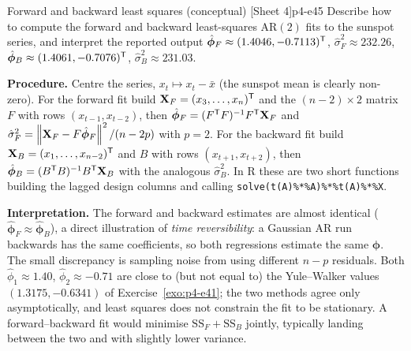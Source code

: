 \begin{exercise}{Forward and backward least squares (conceptual) \quad\textnormal{[Sheet 4]}}{p4-e45}
Describe how to compute the forward and backward least-squares AR$(2)$ fits to
the sunspot series, and interpret the reported output
$\hat{\boldsymbol\phi}_F\approx(1.4046,-0.7113)^{\mathsf{T}}$,
$\hat\sigma_F^2\approx232.26$,
$\hat{\boldsymbol\phi}_B\approx(1.4061,-0.7076)^{\mathsf{T}}$,
$\hat\sigma_B^2\approx231.03$.
\end{exercise}
\begin{solution}
\textbf{Procedure.} Centre the series, $x_t\mapsto x_t-\bar x$ (the sunspot mean
is clearly non-zero). For the forward fit build $\mathbf X_F=(x_3,\dots,x_n)^{\mathsf{T}}$
and the $(n-2)\times2$ matrix $F$ with rows $(x_{t-1},x_{t-2})$, then
$\hat{\boldsymbol\phi}_F=(F^{\mathsf{T}} F)^{-1}F^{\mathsf{T}}\mathbf X_F$ and
$\hat\sigma_F^2=\left\lVert \mathbf X_F-F\hat{\boldsymbol\phi}_F \right\rVert^2/(n-2p)$ with
$p=2$. For the backward fit build $\mathbf X_B=(x_1,\dots,x_{n-2})^{\mathsf{T}}$ and $B$
with rows $(x_{t+1},x_{t+2})$, then
$\hat{\boldsymbol\phi}_B=(B^{\mathsf{T}} B)^{-1}B^{\mathsf{T}}\mathbf X_B$ with the analogous
$\hat\sigma_B^2$. In R these are two short functions building the lagged design
columns and calling \texttt{solve(t(A)\%*\%A)\%*\%t(A)\%*\%X}.

\textbf{Interpretation.} The forward and backward estimates are almost
identical ($\hat{\boldsymbol\phi}_F\approx\hat{\boldsymbol\phi}_B$), a direct
illustration of \emph{time reversibility}: a Gaussian AR run backwards has the
same coefficients, so both regressions estimate the same $\boldsymbol\phi$. The
small discrepancy is sampling noise from using different $n-p$ residuals. Both
$\hat\phi_1\approx1.40$, $\hat\phi_2\approx-0.71$ are close to (but not equal to)
the Yule--Walker values $(1.3175,-0.6341)$ of Exercise~\ref{exo:p4-e41}; the two
methods agree only asymptotically, and least squares does not constrain the fit
to be stationary. A forward--backward fit would minimise
$\mathrm{SS}_F+\mathrm{SS}_B$ jointly, typically landing between the two and with
slightly lower variance.
\end{solution}

